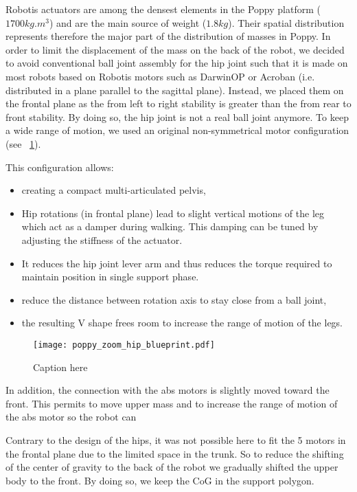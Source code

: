 Robotis actuators are among the densest elements in the Poppy platform ($ 1700 kg.m^{3} $) and are the main source of weight ($1.8 kg$). Their spatial distribution represents therefore the major part of the distribution of masses in Poppy. In order to limit the displacement of the mass on the back of the robot, we decided to avoid conventional ball joint assembly for the hip joint such that it is made on most robots based on Robotis motors such as DarwinOP or Acroban (i.e. distributed in a plane parallel to the sagittal plane). Instead, we placed them on the frontal plane as the from left to right stability is greater than the from rear to front stability. By doing so, the hip joint is not a real ball joint anymore. To keep a wide range of motion, we used an original non-symmetrical motor configuration (see \figurename~\ref{fig:poppy_zoom_hip_blueprint}).

This configuration allows:

\begin{itemize}
    \item creating a compact multi-articulated pelvis,
    \item Hip rotations (in frontal plane) lead to slight vertical motions of the leg which act as a damper during walking. This damping can be tuned by adjusting the stiffness of the actuator.
    \item It reduces the hip joint lever arm and thus reduces the torque required to maintain position in single support phase.
    \item reduce the distance between rotation axis to stay close from a ball joint,
    \item the resulting V shape frees room to increase the range of motion of the legs.
\end{itemize}

\begin{figure}[p]
    \begin{center}
        \texttt{[image: poppy\_zoom\_hip\_blueprint.pdf]}
    \end{center}
    \caption{Caption here}
    \label{fig:poppy_zoom_hip_blueprint}
\end{figure}

In addition, the connection with the abs motors is slightly moved toward the front. This permits to move upper mass and to increase the range of motion of the abs motor so the robot can

Contrary to the design of the hips, it was not possible here to fit the 5 motors in the frontal plane due to the limited space in the trunk. So to reduce the shifting of the center of gravity to the back of the robot we gradually shifted the upper body to the front. By doing so, we keep the CoG in the support polygon.

